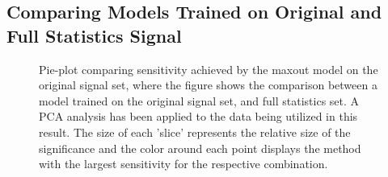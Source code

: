 \subsection{Comparing Models Trained on Original and Full Statistics Signal}\label{appendix:BigVsSmall}
\begin{figure}[H]
    \caption[Pie-plot comparing sensitivity achieved by the maxout model on the original signal set, where the figure shows the comparison between a model trained 
    on the original signal set, and full statistics set.]{Pie-plot comparing sensitivity achieved by the maxout model on the original signal set, where the figure 
    shows the comparison between a model trained on the original signal set, and full statistics set. A \ac{PCA} analysis has been applied to the data being utilized 
    in this result. The size of each 'slice' represents the relative size of the significance and the color around each 
    point displays the method with the largest sensitivity for the respective combination.}
    \label{fig:BigVsLittleSetMaxOut}
\end{figure}
